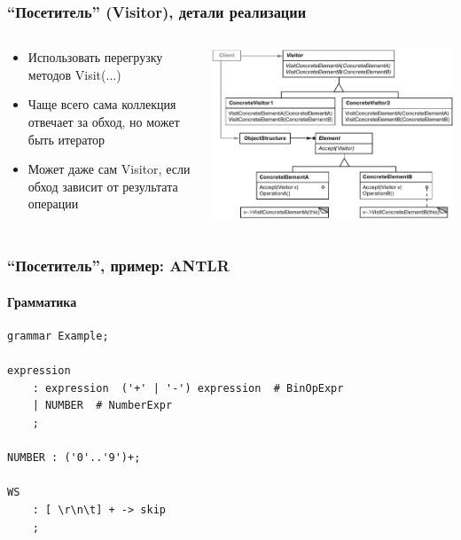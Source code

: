 \documentclass[xetex,mathserif,serif]{beamer}
\begin{document}
    \begin{frame}
        \frametitle{``Посетитель'' (Visitor), детали реализации}
        \begin{columns}
            \begin{column}{0.4\textwidth}
                \begin{itemize}
                    \item Использовать перегрузку методов Visit(...)
                    \item Чаще всего сама коллекция отвечает за обход, но может быть итератор
                    \item Может даже сам Visitor, если обход зависит от результата операции
                \end{itemize}
            \end{column}
            \begin{column}{0.6\textwidth}
                \begin{center}
                    \includegraphics[width=\textwidth]{visitor.png}
                \end{center}
            \end{column}
        \end{columns}
    \end{frame}

    \begin{frame}[fragile]
        \frametitle{``Посетитель'', пример: ANTLR}
        \framesubtitle{Грамматика}
        \begin{verbatim}
grammar Example;

expression
    : expression  ('+' | '-') expression  # BinOpExpr
    | NUMBER  # NumberExpr
    ;

NUMBER : ('0'..'9')+;

WS
    : [ \r\n\t] + -> skip
    ;
        \end{verbatim}
    \end{frame}
\end{document}
